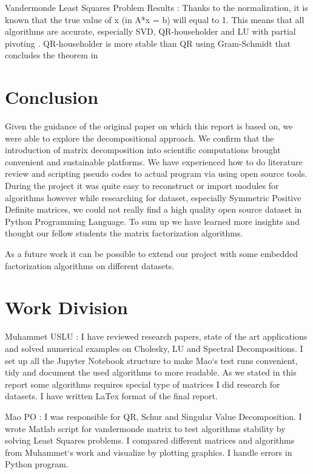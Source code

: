 \documentclass[]{finalproject}
\begin{document}
\begin{flushleft}
\begin{table}[!h]
\caption{Vandermonde Least Squares Problem Results : Thanks to the normalization, it is known that the true value of x (in A*x = b) will equal to 1. This means that all algorithms are accurate, especially SVD, QR-householder and LU with partial pivoting . QR-householder is more stable than QR using Gram-Schmidt that concludes the theorem in \cite{matlab_referece}}
\end{table}

\end{flushleft}
\clearpage

\section{Conclusion} \label{conclusion}
\begin{flushleft}
Given the guidance of the original paper on which this report is based on, we were able to explore the decompositional approach. \newline
We confirm that the introduction of matrix decomposition into scientific computations brought convenient and sustainable platforms. \newline
We have experienced how to do literature review and scripting pseudo codes to actual program via using open source tools.
During the project it was quite easy to reconstruct or import modules for algorithms however while researching for dataset, especially Symmetric Positive Definite matrices, we could not really find a high quality open source dataset in Python Programming Language. \newline
To sum up we have learned more insights and thought our fellow students the matrix factorization algorithms. \newline

As a future work it can be possible to extend our project with some embedded factorization algorithms on different datasets.


\end{flushleft}

\section{Work Division} \label{work}
\begin{flushleft}
Muhammet USLU : I have reviewed research papers, state of the art applications and solved numerical examples on Cholesky, LU and Spectral Decompositions.
I set up all the Jupyter Notebook structure to make Mao`s test runs convenient, tidy and document the used algorithms to more readable.
As we stated in this report some algorithms requires special type of matrices I did research for datasets. I have written LaTex format of the final report.\newline

Mao PO : I was responsible for QR, Schur and Singular Value Decomposition. I wrote Matlab script for vandermonde matrix to test algorithms stability by solving Least Squares problems. I compared different matrices and algorithms from Muhammet`s work and visualize by plotting graphics. I handle errors in Python program.

\end{flushleft}
\clearpage



\clearpage
\end{document}
